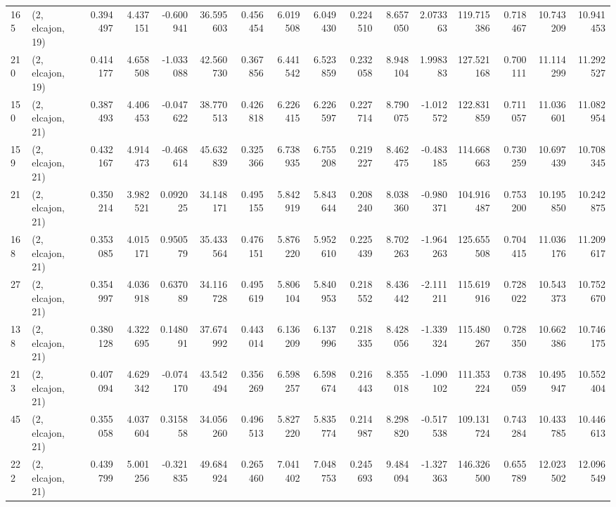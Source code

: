 \begin{tabular}{llrrrrrrrrrrrrrr}
165 &  (2, elcajon, 19) &   0.394497 &   4.437151 & -0.600941 &   36.595603 &  0.456454 &   6.019508 &   6.049430 &  0.224510 &   8.657050 &   2.073363 &  119.715386 &  0.718467 &  10.743209 &  10.941453 \\
210 &  (2, elcajon, 19) &   0.414177 &   4.658508 & -1.033088 &   42.560730 &  0.367856 &   6.441542 &   6.523859 &  0.232058 &   8.948104 &   1.998383 &  127.521168 &  0.700111 &  11.114299 &  11.292527 \\
150 &  (2, elcajon, 21) &   0.387493 &   4.406453 & -0.047622 &   38.770513 &  0.426818 &   6.226415 &   6.226597 &  0.227714 &   8.790075 &  -1.012572 &  122.831859 &  0.711057 &  11.036601 &  11.082954 \\
159 &  (2, elcajon, 21) &   0.432167 &   4.914473 & -0.468614 &   45.632839 &  0.325366 &   6.738935 &   6.755208 &  0.219227 &   8.462475 &  -0.483185 &  114.668663 &  0.730259 &  10.697439 &  10.708345 \\
21  &  (2, elcajon, 21) &   0.350214 &   3.982521 &  0.092025 &   34.148171 &  0.495155 &   5.842919 &   5.843644 &  0.208240 &   8.038360 &  -0.980371 &  104.916487 &  0.753200 &  10.195850 &  10.242875 \\
168 &  (2, elcajon, 21) &   0.353085 &   4.015171 &  0.950579 &   35.433564 &  0.476151 &   5.876220 &   5.952610 &  0.225439 &   8.702263 &  -1.964263 &  125.655508 &  0.704415 &  11.036176 &  11.209617 \\
27  &  (2, elcajon, 21) &   0.354997 &   4.036918 &  0.637089 &   34.116728 &  0.495619 &   5.806104 &   5.840953 &  0.218552 &   8.436442 &  -2.111211 &  115.619916 &  0.728022 &  10.543373 &  10.752670 \\
138 &  (2, elcajon, 21) &   0.380128 &   4.322695 &  0.148091 &   37.674992 &  0.443014 &   6.136209 &   6.137996 &  0.218335 &   8.428056 &  -1.339324 &  115.480267 &  0.728350 &  10.662386 &  10.746175 \\
213 &  (2, elcajon, 21) &   0.407094 &   4.629342 & -0.074170 &   43.542494 &  0.356269 &   6.598257 &   6.598674 &  0.216443 &   8.355018 &  -1.090102 &  111.353224 &  0.738059 &  10.495947 &  10.552404 \\
45  &  (2, elcajon, 21) &   0.355058 &   4.037604 &  0.315858 &   34.056260 &  0.496513 &   5.827220 &   5.835774 &  0.214987 &   8.298820 &  -0.517538 &  109.131724 &  0.743284 &  10.433785 &  10.446613 \\
222 &  (2, elcajon, 21) &   0.439799 &   5.001256 & -0.321835 &   49.684924 &  0.265460 &   7.041402 &   7.048753 &  0.245693 &   9.484094 &  -1.327363 &  146.326500 &  0.655789 &  12.023502 &  12.096549 \\

\end{tabular}
